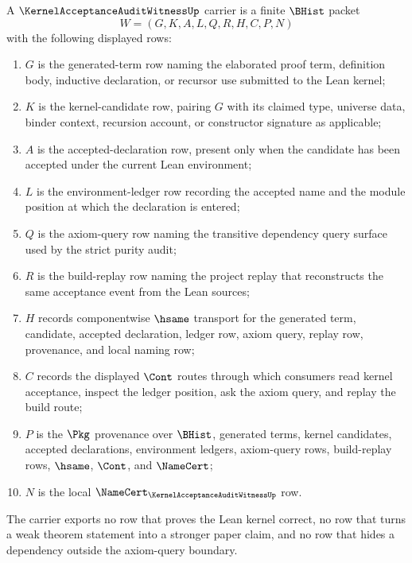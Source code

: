 \begin{definition}
\label{def:kernel-acceptance-audit-witness-carrier}
A $\KernelAcceptanceAuditWitnessUp$ carrier is a finite $\BHist$ packet
$$
W=(G,K,A,L,Q,R,H,C,P,N)
$$
with the following displayed rows:
\begin{enumerate}
\item $G$ is the generated-term row naming the elaborated proof term, definition body, inductive declaration, or recursor use submitted to the Lean kernel;
\item $K$ is the kernel-candidate row, pairing $G$ with its claimed type, universe data, binder context, recursion account, or constructor signature as applicable;
\item $A$ is the accepted-declaration row, present only when the candidate has been accepted under the current Lean environment;
\item $L$ is the environment-ledger row recording the accepted name and the module position at which the declaration is entered;
\item $Q$ is the axiom-query row naming the transitive dependency query surface used by the strict purity audit;
\item $R$ is the build-replay row naming the project replay that reconstructs the same acceptance event from the Lean sources;
\item $H$ records componentwise $\hsame$ transport for the generated term, candidate, accepted declaration, ledger row, axiom query, replay row, provenance, and local naming row;
\item $C$ records the displayed $\Cont$ routes through which consumers read kernel acceptance, inspect the ledger position, ask the axiom query, and replay the build route;
\item $P$ is the $\Pkg$ provenance over $\BHist$, generated terms, kernel candidates, accepted declarations, environment ledgers, axiom-query rows, build-replay rows, $\hsame$, $\Cont$, and $\NameCert$;
\item $N$ is the local $\NameCert_{\KernelAcceptanceAuditWitnessUp}$ row.
\end{enumerate}
The carrier exports no row that proves the Lean kernel correct, no row that turns a weak theorem statement into a stronger paper claim, and no row that hides a dependency outside the axiom-query boundary.
\end{definition}

